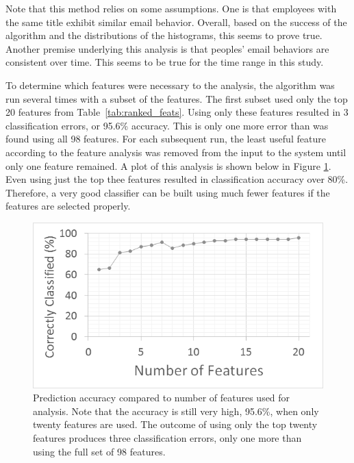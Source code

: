 \documentclass[12pt]{report}
\begin{document}
Note that this method relies on some assumptions.
One is that employees with the same title exhibit similar email behavior.
Overall, based on the success of the algorithm and the distributions of the histograms, this seems to prove true.
Another premise underlying this analysis is that peoples' email behaviors are consistent over time.
This seems to be true for the time range in this study.

To determine which features were necessary to the analysis, the algorithm was run several times with a subset of the features.
The first subset used only the top 20 features from Table~\ref{tab:ranked_feats}.
Using only these features resulted in 3 classification errors, or 95.6\% accuracy.
This is only one more error than was found using all 98 features.
For each subsequent run, the least useful feature according to the feature analysis was removed from the input to the system until only one feature remained.
A plot of this analysis is shown below in Figure \ref{fig:feat_analysis}.
Even using just the top thee features resulted in classification accuracy over 80\%.
Therefore, a very good classifier can be built using much fewer features if the features are selected properly.

\begin{figure}[t]
    \centering
        \includegraphics[width=.9\columnwidth,trim={1mm 6mm 1mm 3.5mm},clip]{FeatureAnalysis}
        \vspace{-7pt}
        \caption{Prediction accuracy compared to number of features used for analysis.  Note that the accuracy is still very high, 95.6\%, when only twenty features are used.  The outcome of using only the top twenty features produces three classification errors, only one more than using the full set of 98 features. }
        \label{fig:feat_analysis}
\end{figure}
\end{document}
